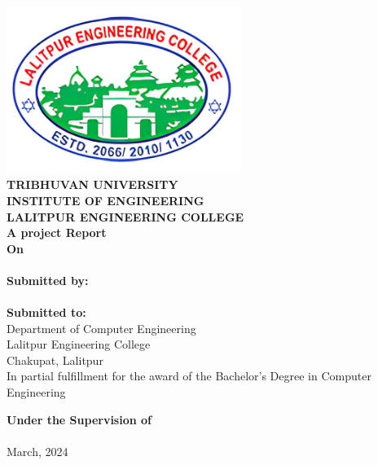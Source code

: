 \begin{center}
    \linespread{1.6}
    \thispagestyle{empty}
    \includegraphics[width= 3in ]{img/leclogo21.png} \\
    \vspace{0.05 in}
    {\fontsize{12 pt}{12} \selectfont\textbf{TRIBHUVAN UNIVERSITY} \\
        \textbf{INSTITUTE OF ENGINEERING} \\
        \textbf{LALITPUR ENGINEERING COLLEGE}} \\

    \vspace{0.5 in}
    \textbf{A project Report}\\
    {\fontsize{12 pt}{12} \selectfont\textbf{On}\\}
    {\fontsize{12 pt}{12} \selectfont \textbf{\thetitle}}\\
    \vspace{0.5 in}
    \textbf{ Submitted by:}  \\
    {\theauthor} \\
    \vspace{0.4 in}
    \textbf{ Submitted to:}  \\
    Department of Computer Engineering \\
    Lalitpur Engineering College \\
    Chakupat, Lalitpur \\

    \vspace{0.3in}
    In partial fulfillment for the award of the
    Bachelor's Degree in Computer Engineering

    \vspace{0.3in}
    \textbf{Under the Supervision of} \\
    \thesupervisor\\
    \vspace{0.3in}
    March, 2024 \\

\end{center}
